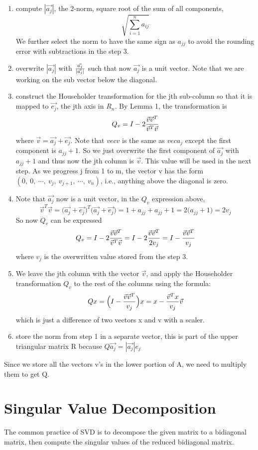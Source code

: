 \begin{enumerate}
\item compute \(|\vec{a_j}|\), the 2-norm, square root of the sum of all components, \[\sqrt{\sum_{i=1}^{n}{a_{ij}}}\] We further select the norm to have the same sign as \(a_{jj}\) to avoid the rounding error with subtractions in the step 3.
\item overwrite \(|\vec{a_j}|\) with \(\vec{a_j} \over |\vec{a_j}|\) such that now \(\vec{a_j}\) is a unit vector. Note that we are working on the sub vector below the diagonal.
\item construct the Householder transformation for the jth sub-column so that it is mapped to \(\vec{e_j}\), the jth axis in \(R_n\). By Lemma 1, the transformation is 
\[Q_v = I - 2 {{\vec{v} \vec{v}^T} \over {\vec{v}^T \vec{v}}}\] 
where \(\vec{v} = \vec{a_j} + \vec{e_j}\). Note that \(vec{v}\) is the same as \(vec{a_j}\) except the first component is \(a_{jj} + 1\). So we just overwrite the first component of \(\vec{a_j}\) with \(a_{jj} + 1\) and thus now the jth column is \(\vec{v}\). This value will be used in the next step. As we progress j from 1 to m, the vector v has the form \(\left(0,\ 0,\ \cdots,\ v_j,\ v_{j+1},\  \cdots,\ v_n\right)\), i.e., anything above the diagonal is zero. 
\item Note that \(\vec{a_j}\) now is a unit vector, in the \(Q_v\) expression above, 
\[\vec{v}^T \vec{v} = \bigl(\vec{a_j} + \vec{e_j}\bigr)^T\bigl(\vec{a_j} + \vec{e_j}\bigr) = 
1 + a_{jj} + a_{jj} + 1 = 2\bigl(a_{jj} + 1\bigr) = 2v_j\]
So now \(Q_v\) can be expressed 
\[Q_v = I - 2 {{\vec{v} \vec{v}^T} \over {\vec{v}^T \vec{v}}} =
I - 2  {{\vec{v} \vec{v}^T} \over {2v_j}} = 
I - {{\vec{v} \vec{v}^T} \over {v_j}}\] 
where \(v_j\) is the overwritten value stored from the step 3.
\item We leave the jth column with the vector \(\vec{v}\), and apply the Householder transformation \(Q_v\) to the rest of the columns using the formula:
\[Qx = \Bigl(I - {{\vec{v} \vec{v}^T} \over v_j}\Bigr)x = 
x - {{\vec{v}^Tx} \over v_j}\vec{v}\] 
which is just a difference of two vectors x and v with a scaler.
\item store the norm from step 1 in a separate vector, this is part of the upper triangular matrix R because \(Q\vec{a_j} = |\vec{a_j}|e_j\)
\end{enumerate}
Since we store all the vectors v's in the lower portion of A, we need to multiply them to get Q.

\section{Singular Value Decomposition}
The common practice of SVD is to decompose the given matrix to a bidiagonal matrix, then compute the singular values of the reduced bidiagonal matrix.

